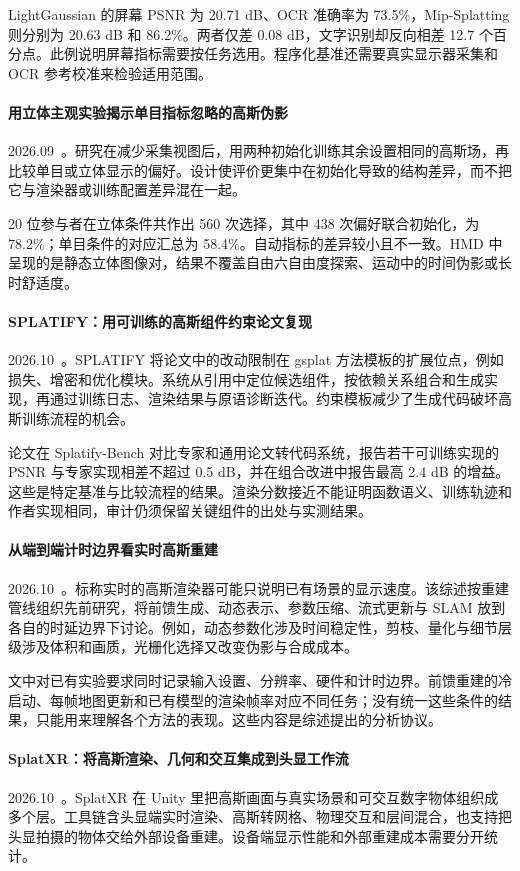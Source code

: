 LightGaussian 的屏幕 PSNR 为 20.71 dB、OCR 准确率为 73.5\%，Mip-Splatting 则分别为 20.63 dB 和 86.2\%。两者仅差 0.08 dB，文字识别却反向相差 12.7 个百分点。此例说明屏幕指标需要按任务选用。程序化基准还需要真实显示器采集和 OCR 参考校准来检验适用范围。

\paragraph{用立体主观实验揭示单目指标忽略的高斯伪影}
2026.09~\cite{2609_38525}。研究在减少采集视图后，用两种初始化训练其余设置相同的高斯场，再比较单目或立体显示的偏好。设计使评价更集中在初始化导致的结构差异，而不把它与渲染器或训练配置差异混在一起。

20 位参与者在立体条件共作出 560 次选择，其中 438 次偏好联合初始化，为 78.2\%；单目条件的对应汇总为 58.4\%。自动指标的差异较小且不一致。HMD 中呈现的是静态立体图像对，结果不覆盖自由六自由度探索、运动中的时间伪影或长时舒适度。

\paragraph{SPLATIFY：用可训练的高斯组件约束论文复现}
2026.10~\cite{2610_09116}。SPLATIFY 将论文中的改动限制在 gsplat 方法模板的扩展位点，例如损失、增密和优化模块。系统从引用中定位候选组件，按依赖关系组合和生成实现，再通过训练日志、渲染结果与原语诊断迭代。约束模板减少了生成代码破坏高斯训练流程的机会。

论文在 Splatify-Bench 对比专家和通用论文转代码系统，报告若干可训练实现的 PSNR 与专家实现相差不超过 0.5 dB，并在组合改进中报告最高 2.4 dB 的增益。这些是特定基准与比较流程的结果。渲染分数接近不能证明函数语义、训练轨迹和作者实现相同，审计仍须保留关键组件的出处与实测结果。

\paragraph{从端到端计时边界看实时高斯重建}
2026.10~\cite{2610_17513}。标称实时的高斯渲染器可能只说明已有场景的显示速度。该综述按重建管线组织先前研究，将前馈生成、动态表示、参数压缩、流式更新与 SLAM 放到各自的时延边界下讨论。例如，动态参数化涉及时间稳定性，剪枝、量化与细节层级涉及体积和画质，光栅化选择又改变伪影与合成成本。

文中对已有实验要求同时记录输入设置、分辨率、硬件和计时边界。前馈重建的冷启动、每帧地图更新和已有模型的渲染帧率对应不同任务；没有统一这些条件的结果，只能用来理解各个方法的表现。这些内容是综述提出的分析协议。

\paragraph{SplatXR：将高斯渲染、几何和交互集成到头显工作流}
2026.10~\cite{2610_26338}。SplatXR 在 Unity 里把高斯画面与真实场景和可交互数字物体组织成多个层。工具链含头显端实时渲染、高斯转网格、物理交互和层间混合，也支持把头显拍摄的物体交给外部设备重建。设备端显示性能和外部重建成本需要分开统计。

